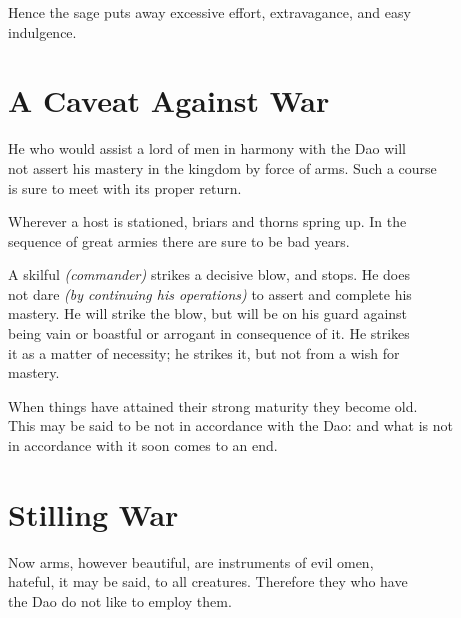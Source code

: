     Hence the sage puts away excessive effort, extravagance, and easy\\
    indulgence.\vspace{\baselineskip}
    
\section*{A Caveat Against War}
He who would assist a lord of men in harmony with the Dao will\\
not assert his mastery in the kingdom by force of arms. Such a course\\
is sure to meet with its proper return.\vspace{\baselineskip}

Wherever a host is stationed, briars and thorns spring up. In the\\
sequence of great armies there are sure to be bad years.\vspace{\baselineskip}

A skilful \textit{(commander)} strikes a decisive blow, and stops. He does\\
not dare \textit{(by continuing his operations)} to assert and complete his\\
mastery. He will strike the blow, but will be on his guard against\\
being vain or boastful or arrogant in consequence of it. He strikes\\
it as a matter of necessity; he strikes it, but not from a wish for\\
mastery.\vspace{\baselineskip}

When things have attained their strong maturity they become old.\\
This may be said to be not in accordance with the Dao: and what is not\\
in accordance with it soon comes to an end.\vspace{\baselineskip}

\section*{Stilling War}
    Now arms, however beautiful, are instruments of evil omen,\\
    hateful, it may be said, to all creatures. Therefore they who have\\
    the Dao do not like to employ them.\vspace{\baselineskip}
    
